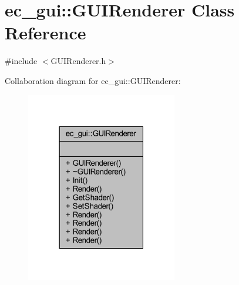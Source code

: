 \hypertarget{classec__gui_1_1_g_u_i_renderer}{}\section{ec\+\_\+gui\+:\+:G\+U\+I\+Renderer Class Reference}
\label{classec__gui_1_1_g_u_i_renderer}


{\ttfamily \#include $<$G\+U\+I\+Renderer.\+h$>$}



Collaboration diagram for ec\+\_\+gui\+:\+:G\+U\+I\+Renderer\+:\nopagebreak
\begin{figure}[H]
\begin{center}
\leavevmode
\includegraphics[width=187pt]{classec__gui_1_1_g_u_i_renderer__coll__graph}
\end{center}
\end{figure}
